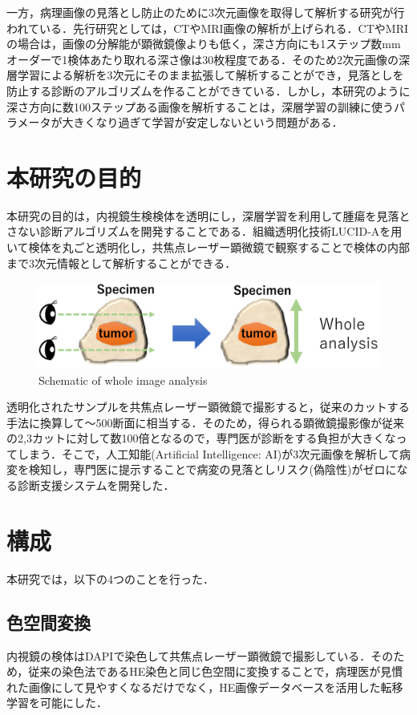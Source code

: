 一方，病理画像の見落とし防止のために3次元画像を取得して解析する研究が行われている．先行研究としては，CT\cite{dou20163d}やMRI\cite{fmri}画像の解析が上げられる．CTやMRIの場合は，画像の分解能が顕微鏡像よりも低く，深さ方向にも1ステップ数mmオーダーで1検体あたり取れる深さ像は30枚程度である．そのため2次元画像の深層学習による解析を3次元にそのまま拡張して解析することができ，見落としを防止する診断のアルゴリズムを作ることができている．しかし，本研究のように深さ方向に数100ステップある画像を解析することは，深層学習の訓練に使うパラメータが大きくなり過ぎて学習が安定しないという問題がある．


\section{本研究の目的}
本研究の目的は，内視鏡生検検体を透明にし，深層学習を利用して腫瘍を見落とさない診断アルゴリズムを開発することである．組織透明化技術LUCID-Aを用いて検体を丸ごと透明化し，共焦点レーザー顕微鏡で観察することで検体の内部まで3次元情報として解析することができる．

\begin{figure}[H]
	\centering
	\includegraphics[width=0.9\linewidth]{fig/chapter1/whole_image_analysis}
	\caption{Schematic of whole image analysis}
	\label{fig:wholeimageanalysis}
\end{figure}

透明化されたサンプルを共焦点レーザー顕微鏡で撮影すると，従来のカットする手法に換算して〜500断面に相当する．そのため，得られる顕微鏡撮影像が従来の2,3カットに対して数100倍となるので，専門医が診断をする負担が大きくなってしまう．そこで，人工知能(Artificial Intelligence: AI)が3次元画像を解析して病変を検知し，専門医に提示することで病変の見落としリスク(偽陰性)がゼロになる診断支援システムを開発した．

\section{構成}
本研究では，以下の4つのことを行った．

\subsection*{色空間変換}
内視鏡の検体はDAPIで染色して共焦点レーザー顕微鏡で撮影している．そのため，従来の染色法であるHE染色と同じ色空間に変換することで，病理医が見慣れた画像にして見やすくなるだけでなく，HE画像データベースを活用した転移学習を可能にした．

